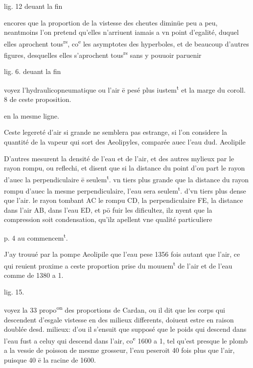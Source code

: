 \documentclass[11pt,a4paper]{article}
\begin{document}
lig. 12 deuant la fin

encores que la proportion de la vistesse des cheutes diminüe peu a peu, neantmoins l'on pretend qu'elles n'arriuent iamais a vn point d'egalité, duquel elles aprochent tous\textsuperscript{rs}, co\textsuperscript{e} les asymptotes des hyperboles, et de beaucoup d'autres figures, desquelles elles s'aprochent tous\textsuperscript{rs} sans y pouuoir paruenir

lig. 6. deuant la fin

voyez l'hydraulicopneumatique ou l'air ē pesé plus iustem\textsuperscript{t} et la marge du coroll. 8 de ceste proposition.

en la mesme ligne.

Ceste legereté d'air si grande ne semblera pas estrange, si l'on considere la quantité de la vapeur qui sort des Aeolipyles, comparée auec l'eau dud. Aeolipile

D'autres mesurent la densité de l'eau et de l'air, et des autres mylieux par le rayon rompu, ou reflechi, et disent que si la distance du point d'ou part le rayon d'auec la perpendiculaire ē seulem\textsuperscript{t}. vn tiers plus grande que la distance du rayon rompu d'auec la mesme perpendiculaire, l'eau sera seulem\textsuperscript{t}. d'vn tiers plus dense que l'air. le rayon tombant AC le rompu CD, la perpendiculaire FE, la distance dans l'air AB, dans l'eau ED, et pō fuir les dificultez, ilz nyent que la compression soit condensation, qu'ilz apellent vne qualité particuliere

p. 4 au commencem\textsuperscript{t}.

J'ay trouué par la pompe Aeolipile que l'eau pese 1356 fois autant que l'air, ce qui reuient proxime a ceste proportion prise du mouuem\textsuperscript{t} de l'air et de l'eau comme de 1380 a 1.

lig. 15.

voyez la 33 propo\textsuperscript{on} des proportions de Cardan, ou il dit que les corps qui descendent d'esgale vistesse en des milieux differents, doiuent estre en raison doublée desd. milieux: d'ou il s'ensuit que supposé que le poids qui descend dans l'eau fust a celuy qui descend dans l'air, co\textsuperscript{e} 1600 a 1, tel qu'est presque le plomb a la vessie de poisson de mesme grosseur, l'eau peseroit 40 fois plus que l'air, puisque 40 ē la racine de 1600.
\end{document}
